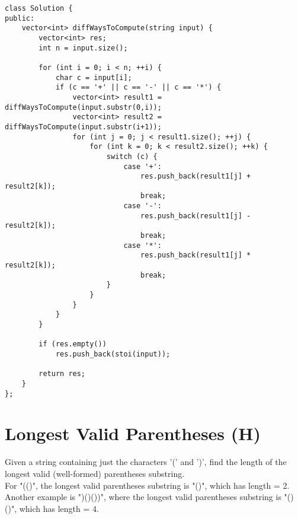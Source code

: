 \begin{lstlisting}
class Solution {
public:
    vector<int> diffWaysToCompute(string input) {
        vector<int> res;
        int n = input.size();
        
        for (int i = 0; i < n; ++i) {
            char c = input[i];
            if (c == '+' || c == '-' || c == '*') {
                vector<int> result1 = diffWaysToCompute(input.substr(0,i));
                vector<int> result2 = diffWaysToCompute(input.substr(i+1));
                for (int j = 0; j < result1.size(); ++j) {
                    for (int k = 0; k < result2.size(); ++k) {
                        switch (c) {
                            case '+':
                                res.push_back(result1[j] + result2[k]);
                                break;
                            case '-':
                                res.push_back(result1[j] - result2[k]);
                                break;
                            case '*':
                                res.push_back(result1[j] * result2[k]);
                                break;
                        }
                    }
                }
            }
        }
        
        if (res.empty())
            res.push_back(stoi(input));
            
        return res;
    }
};
\end{lstlisting}


\section{Longest Valid Parentheses (H)}
Given a string containing just the characters '(' and ')', find the length of the longest valid (well-formed) parentheses substring. \\

For "(()", the longest valid parentheses substring is "()", which has length = 2.\\

Another example is ")()())", where the longest valid parentheses substring is "()()", which has length = 4. \\

